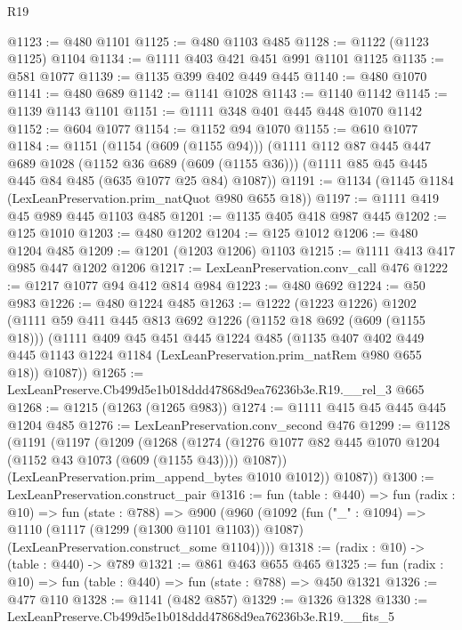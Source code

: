 \begin{lexlean}{R19}
\begin{coremodule}
@1123 := @480 @1101
@1125 := @480 @1103 @485
@1128 := @1122 (@1123 @1125) @1104
@1134 := @1111 @403 @421 @451 @991 @1101 @1125
@1135 := @581 @1077
@1139 := @1135 @399 @402 @449 @445
@1140 := @480 @1070
@1141 := @480 @689
@1142 := @1141 @1028
@1143 := @1140 @1142
@1145 := @1139 @1143 @1101
@1151 := @1111 @348 @401 @445 @448 @1070 @1142
@1152 := @604 @1077
@1154 := @1152 @94 @1070
@1155 := @610 @1077
@1184 := @1151
    (@1154 (@609 (@1155 @94)))
    (@1111
      @112
      @87
      @445
      @447
      @689
      @1028
      (@1152 @36 @689 (@609 (@1155 @36)))
      (@1111 @85 @45 @445 @445 @84 @485 (@635 @1077 @25 @84) @1087))
@1191 := @1134 (@1145 @1184 (LexLeanPreservation.prim_natQuot @980 @655 @18))
@1197 := @1111 @419 @45 @989 @445 @1103 @485
@1201 := @1135 @405 @418 @987 @445
@1202 := @125 @1010
@1203 := @480 @1202
@1204 := @125 @1012
@1206 := @480 @1204 @485
@1209 := @1201 (@1203 @1206) @1103
@1215 := @1111 @413 @417 @985 @447 @1202 @1206
@1217 := LexLeanPreservation.conv_call @476
@1222 := @1217 @1077 @94 @412 @814 @984
@1223 := @480 @692
@1224 := @50 @983
@1226 := @480 @1224 @485
@1263 := @1222
    (@1223 @1226)
    @1202
    (@1111
      @59
      @411
      @445
      @813
      @692
      @1226
      (@1152 @18 @692 (@609 (@1155 @18)))
      (@1111
        @409
        @45
        @451
        @445
        @1224
        @485
        (@1135
          @407
          @402
          @449
          @445
          @1143
          @1224
          @1184
          (LexLeanPreservation.prim_natRem @980 @655 @18))
        @1087))
@1265 := LexLeanPreserve.Cb499d5e1b018ddd47868d9ea76236b3e.R19.__rel_3 @665
@1268 := @1215 (@1263 (@1265 @983))
@1274 := @1111 @415 @45 @445 @445 @1204 @485
@1276 := LexLeanPreservation.conv_second @476
@1299 := @1128
    (@1191
      (@1197
        (@1209
          (@1268
            (@1274 (@1276 @1077 @82 @445 @1070 @1204 (@1152 @43 @1073 (@609 (@1155 @43)))) @1087))
          (LexLeanPreservation.prim_append_bytes @1010 @1012))
        @1087))
@1300 := LexLeanPreservation.construct_pair
@1316 := fun (table : @440) =>
  fun (radix : @10) =>
  fun (state : @788) =>
  @900
    (@960
      (@1092
        (fun ("_" : @1094) =>
        @1110
          (@1117 (@1299 (@1300 @1101 @1103)) @1087)
          (LexLeanPreservation.construct_some @1104))))
@1318 := (radix : @10) -> (table : @440) -> @789
@1321 := @861 @463 @655 @465
@1325 := fun (radix : @10) => fun (table : @440) => fun (state : @788) => @450 @1321
@1326 := @477 @110
@1328 := @1141 (@482 @857)
@1329 := @1326 @1328
@1330 := LexLeanPreserve.Cb499d5e1b018ddd47868d9ea76236b3e.R19.__fits_5

\end{coremodule}
\end{lexlean}
